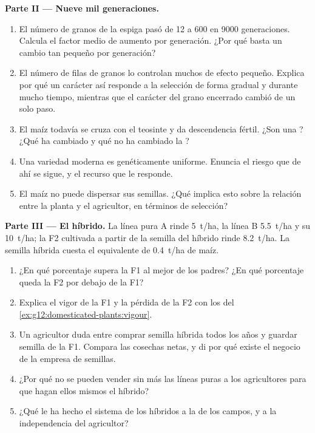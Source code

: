 \begin{problem}
\medskip
\noindent\textbf{Parte II --- Nueve mil generaciones.}
\begin{enumerate}[resume]
  \item El número de granos de la espiga pasó de 12 a 600 en 9000
        generaciones. Calcula el factor medio de aumento por
        generación. ¿Por qué basta un cambio tan pequeño por
        generación?
  \item El número de filas de granos lo controlan muchos  de
        efecto pequeño. Explica por qué un carácter así responde a la
        selección de forma gradual y durante mucho tiempo, mientras que
        el carácter del grano encerrado cambió de un solo paso.
  \item El maíz todavía se cruza con el teosinte y da descendencia
        fértil. ¿Son una ? ¿Qué ha cambiado y qué no ha cambiado
        la ?
  \item Una variedad moderna es genéticamente uniforme. Enuncia el
        riesgo que de ahí se sigue, y el recurso que le responde.
  \item El maíz no puede dispersar sus semillas. ¿Qué implica esto
        sobre la relación entre la planta y el agricultor, en términos
        de selección?
\end{enumerate}

\medskip
\noindent\textbf{Parte III --- El híbrido.}
La línea pura A rinde \qty{5}{t/ha}, la línea B \qty{5.5}{t/ha} y su
 \qty{10}{t/ha}; la F2 cultivada a partir de la semilla del
híbrido rinde \qty{8.2}{t/ha}. La semilla híbrida cuesta el equivalente
de \qty{0.4}{t/ha} de maíz.
\begin{enumerate}[resume]
  \item ¿En qué porcentaje supera la F1 al mejor de los padres? ¿En qué
        porcentaje queda la F2 por debajo de la F1?
  \item Explica el vigor de la F1 y la pérdida de la F2 con los
         del \cref{ex:g12:domesticated-plants:vigour}.
  \item Un agricultor duda entre comprar semilla híbrida todos los años
        y guardar semilla de la F1. Compara las cosechas netas, y di
        por qué existe el negocio de la empresa de semillas.
  \item ¿Por qué no se pueden vender sin más las líneas puras a los
        agricultores para que hagan ellos mismos el híbrido?
  \item ¿Qué le ha hecho el sistema de los híbridos a la  de los campos, y a la independencia del agricultor?
\end{enumerate}


\end{problem}
